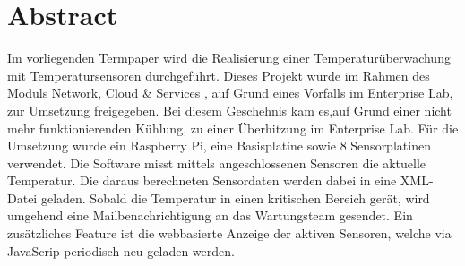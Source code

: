 \section*{Abstract}
Im vorliegenden Termpaper wird die Realisierung einer Temperaturüberwachung mit Temperatursensoren durchgeführt. Dieses Projekt  wurde im Rahmen des Moduls \grqq{}Network, Cloud \& Services\glqq{} , auf Grund eines Vorfalls im Enterprise Lab, zur Umsetzung freigegeben. Bei diesem Geschehnis kam es,auf Grund einer nicht mehr funktionierenden Kühlung, zu einer Überhitzung im Enterprise Lab.
Für die Umsetzung wurde ein Raspberry Pi, eine Basisplatine sowie 8 Sensorplatinen verwendet. Die Software misst mittels angeschlossenen Sensoren die aktuelle Temperatur. Die daraus berechneten Sensordaten werden dabei in eine XML-Datei geladen. Sobald die Temperatur in einen kritischen Bereich gerät, wird umgehend eine Mailbenachrichtigung an das Wartungsteam gesendet. Ein zusätzliches Feature ist die webbasierte Anzeige der aktiven Sensoren, welche via JavaScrip periodisch neu geladen werden.
 
\clearpage